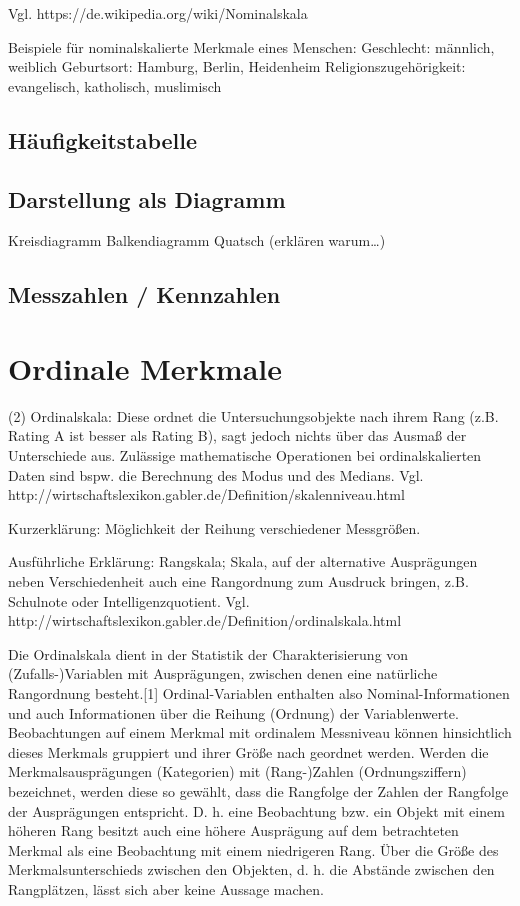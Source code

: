 Vgl. https://de.wikipedia.org/wiki/Nominalskala

\todo[Einbauen]
Beispiele für nominalskalierte Merkmale eines Menschen:
Geschlecht: männlich, weiblich
Geburtsort: Hamburg, Berlin, Heidenheim
Religionszugehörigkeit: evangelisch, katholisch, muslimisch



\subsection{Häufigkeitstabelle}

\subsection{Darstellung als Diagramm}
Kreisdiagramm
Balkendiagramm Quatsch (erklären warum\ldots)

\subsection{Messzahlen / Kennzahlen}


\section{Ordinale Merkmale}
\todo[Umformulieren]
(2) Ordinalskala: Diese ordnet die Untersuchungsobjekte nach ihrem Rang (z.B. Rating A ist besser als Rating B), sagt jedoch nichts über das Ausmaß der Unterschiede aus. Zulässige mathematische Operationen bei ordinalskalierten Daten sind bspw. die Berechnung des Modus und des Medians.
Vgl. http://wirtschaftslexikon.gabler.de/Definition/skalenniveau.html

Kurzerklärung:
Möglichkeit der Reihung verschiedener Messgrößen.

Ausführliche Erklärung:
Rangskala; Skala, auf der alternative Ausprägungen neben Verschiedenheit auch eine Rangordnung zum Ausdruck bringen, z.B. Schulnote oder Intelligenzquotient.
Vgl. http://wirtschaftslexikon.gabler.de/Definition/ordinalskala.html

\todo[Umformulieren]
Die Ordinalskala dient in der Statistik der Charakterisierung von (Zufalls-)Variablen mit Ausprägungen, zwischen denen eine natürliche Rangordnung besteht.[1] Ordinal-Variablen enthalten also Nominal-Informationen und auch Informationen über die Reihung (Ordnung) der Variablenwerte. Beobachtungen auf einem Merkmal mit ordinalem Messniveau können hinsichtlich dieses Merkmals gruppiert und ihrer Größe nach geordnet werden.
Werden die Merkmalsausprägungen (Kategorien) mit (Rang-)Zahlen (Ordnungsziffern) bezeichnet, werden diese so gewählt, dass die Rangfolge der Zahlen der Rangfolge der Ausprägungen entspricht. D. h. eine Beobachtung bzw. ein Objekt mit einem höheren Rang besitzt auch eine höhere Ausprägung auf dem betrachteten Merkmal als eine Beobachtung mit einem niedrigeren Rang. Über die Größe des Merkmalsunterschieds zwischen den Objekten, d. h. die Abstände zwischen den Rangplätzen, lässt sich aber keine Aussage machen.


